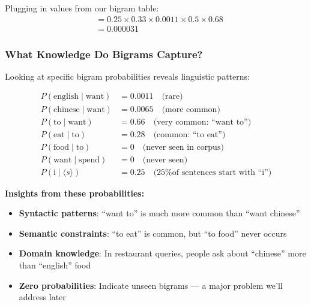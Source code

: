 \documentclass[11pt,a4paper]{article}
\theoremstyle{definition}
\theoremstyle{plain}
\theoremstyle{remark}
\begin{document}
Plugging in values from our bigram table:
\begin{align*}
&= 0.25 \times 0.33 \times 0.0011 \times 0.5 \times 0.68 \\
&= 0.000031
\end{align*}

\subsubsection{What Knowledge Do Bigrams Capture?}

Looking at specific bigram probabilities reveals linguistic patterns:

\begin{align*}
P(\text{english} \mid \text{want}) &= 0.0011 \quad \text{(rare)} \\
P(\text{chinese} \mid \text{want}) &= 0.0065 \quad \text{(more common)} \\
P(\text{to} \mid \text{want}) &= 0.66 \quad \text{(very common: ``want to'')} \\
P(\text{eat} \mid \text{to}) &= 0.28 \quad \text{(common: ``to eat'')} \\
P(\text{food} \mid \text{to}) &= 0 \quad \text{(never seen in corpus)} \\
P(\text{want} \mid \text{spend}) &= 0 \quad \text{(never seen)} \\
P(\text{i} \mid \langle s \rangle) &= 0.25 \quad \text{(25\% of sentences start with ``i'')}
\end{align*}

\textbf{Insights from these probabilities:}
\begin{itemize}
    \item \textbf{Syntactic patterns}: ``want to'' is much more common than ``want chinese''
    \item \textbf{Semantic constraints}: ``to eat'' is common, but ``to food'' never occurs
    \item \textbf{Domain knowledge}: In restaurant queries, people ask about ``chinese'' more than ``english'' food
    \item \textbf{Zero probabilities}: Indicate unseen bigrams — a major problem we'll address later
\end{itemize}
\end{document}
